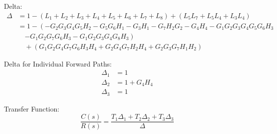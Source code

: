 \documentclass[11pt]{article}
\begin{document}
Delta:
{\small
\begin{align*}
\Delta &= 1 - (L_1 + L_2 + L_3 + L_4 + L_5 + L_6 + L_7 + L_8) + (L_5 L_7 + L_5 L_4 + L_3 L_4) \\
       &= 1 - \left( -G_2 G_3 G_4 G_5 H_2 - G_5 G_6 H_1 - G_3 H_1 - G_7 H_2 G_2 - G_4 H_4 - G_1 G_2 G_3 G_4 G_5 G_6 H_3 \right. \\
       &\quad \left. - G_1 G_2 G_7 G_6 H_3 - G_1 G_2 G_3 G_4 G_8 H_3 \right) \\
       &\quad + \left( G_1 G_2 G_4 G_7 G_6 H_3 H_4 + G_2 G_4 G_7 H_2 H_4 + G_2 G_3 G_7 H_1 H_2 \right)
\end{align*}
}

\vspace{0.5em}

Delta for Individual Forward Paths:
\begin{align*}
\Delta_1 &= 1 \\
\Delta_2 &= 1 + G_4 H_4 \\
\Delta_3 &= 1
\end{align*}

\vspace{0.5em}

Transfer Function:
\[
\frac{C(s)}{R(s)} = \frac{T_1 \Delta_1 + T_2 \Delta_2 + T_3 \Delta_3}{\Delta}
\]

\noindent{}
\end{document}
